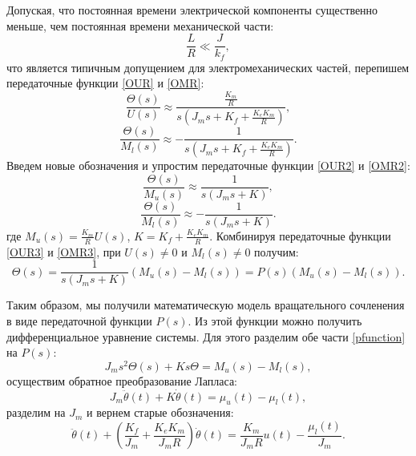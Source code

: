 Допуская, что постоянная времени электрической компоненты существенно меньше, чем постоянная времени механической части:
\begin{equation}
	\frac{L}{R}\ll\frac{J}{k_f},
\end{equation}
что является типичным допущением для электромеханических частей, перепишем передаточные функции \eqref{OUR} и \eqref{OMR}:
\begin{equation}\label{OUR2}
	\frac{\Theta(s)}{U(s)}\approx\frac{\frac{K_m}{R}}{s(J_ms+K_f+\frac{K_eK_m}{R})},
\end{equation}
\begin{equation}\label{OMR2}
	\frac{\Theta(s)}{M_l(s)}\approx-\frac{1}{s(J_ms+K_f+\frac{K_eK_m}{R})}.
\end{equation}
Введем новые обозначения и упростим передаточные функции \eqref{OUR2} и \eqref{OMR2}:
\begin{equation}\label{OUR3}
	\frac{\Theta(s)}{M_u(s)}\approx\frac{1}{s(J_ms+K)},
\end{equation}
\begin{equation}\label{OMR3}
	\frac{\Theta(s)}{M_l(s)}\approx-\frac{1}{s(J_ms+K)}.
\end{equation}
где $M_u(s)= \frac{K_m}{R}U(s)$, $K=K_f+\frac{K_eK_m}{R}$.
Комбинируя передаточные функции \eqref{OUR3} и \eqref{OMR3}, при $U(s)\neq0$ и $M_l(s)\neq0$ получим:
\begin{equation}\label{pfunction}
	\Theta(s)=\frac{1}{s(J_ms+K)}(M_u(s)-M_l(s))=P(s)(M_u(s)-M_l(s)).
\end{equation}

Таким образом, мы получили математическую модель вращательного сочленения в виде передаточной функции $P(s)$. Из этой функции можно получить дифференциальное уравнение системы. Для этого разделим обе части \eqref{pfunction} на $P(s)$:
\begin{equation}
	J_ms^2\Theta(s)+Ks\Theta=M_u(s)-M_l(s),
\end{equation}
осуществим обратное преобразование Лапласа:
\begin{equation}
	J_m\ddot{\theta}(t)+K\dot{\theta}(t)=\mu_u(t)-\mu_l(t),
\end{equation}
разделим на $J_m$ и вернем старые обозначения:
\begin{equation}\label{dif}
	\ddot{\theta}(t)+(\frac{K_f}{J_m}+\frac{K_eK_m}{J_mR})\dot{\theta}(t)=\frac{K_m}{J_mR}u(t)-\frac{\mu_l(t)}{J_m}.
\end{equation}
